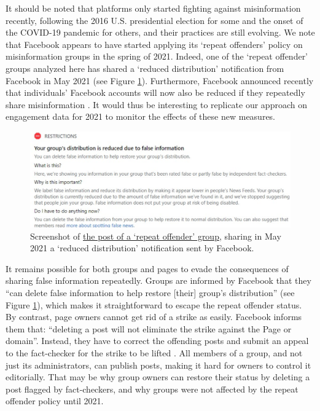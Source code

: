 \documentclass[review]{elsarticle}
\begin{document}
{{It should be noted that platforms only started fighting against misinformation recently, following the 2016 U.S. presidential election for some and the onset of the COVID-19 pandemic for others, and their practices are still evolving.
We note that Facebook appears to have started applying its `repeat offenders’ policy on misinformation groups in the spring of 2021. 
Indeed, one of the `repeat offender' groups analyzed here has shared a `reduced distribution' notification from Facebook in May 2021 (see Figure \ref{screenshot_reduced_group}).
Furthermore, Facebook announced recently that individuals' Facebook accounts will now also be reduced if they repeatedly share misinformation \cite{FacebookReduceUsers}.
It would thus be interesting to replicate our approach on engagement data for 2021 to monitor the effects of these new measures.

\begin{figure}[!h]
\centering
\includegraphics[scale=0.24]{./../figure/screenshot_reduced_group.png}
\caption{
Screenshot of \href{https://www.facebook.com/groups/mcbowwow/posts/3893068180741848/}{the post of a `repeat offender' group}, sharing in May 2021 a `reduced distribution' notification sent by Facebook.
}
\label{screenshot_reduced_group}
\end{figure}

It remains possible for both groups and pages to evade the consequences of sharing false information repeatedly. 
Groups are informed by Facebook that they ``can delete false information to help restore [their] group's distribution'' (see Figure \ref{screenshot_reduced_group}), which makes it straightforward to escape the repeat offender status.
By contrast, page owners cannot get rid of a strike as easily. 
Facebook informs them that: ``deleting a post will not eliminate the strike against the Page or domain''. 
Instead, they have to correct the offending posts and submit an appeal to the fact-checker for the strike to be lifted \cite{FacebookCorrectRating}.
All members of a group, and not just its administrators, can publish posts,  making it hard for owners to control it editorially. 
That may be why group owners can restore their status by deleting a post flagged by fact-checkers, and why groups were not affected by the repeat offender policy until 2021.

}}
\end{document}

